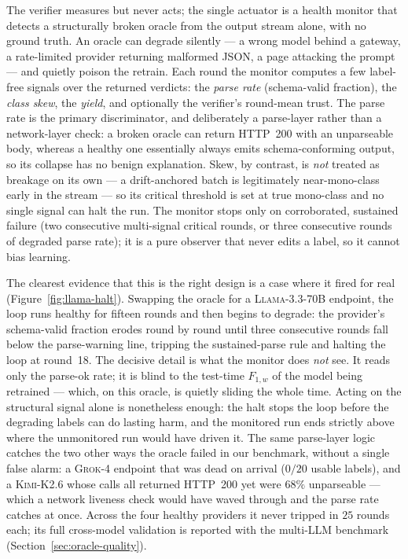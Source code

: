 The verifier measures but never acts; the single actuator is a health monitor
that detects a structurally broken oracle from the output stream alone, with no
ground truth. An oracle can degrade silently --- a wrong model behind a gateway, a
rate-limited provider returning malformed JSON, a page attacking the prompt ---
and quietly poison the retrain. Each round the monitor computes a few label-free
signals over the returned verdicts: the \emph{parse rate} (schema-valid
fraction), the \emph{class skew}, the \emph{yield}, and optionally the verifier's
round-mean trust. The parse rate is the primary discriminator, and deliberately a
parse-layer rather than a network-layer check: a broken oracle can return
HTTP~200 with an unparseable body, whereas a healthy one essentially always emits
schema-conforming output, so its collapse has no benign explanation. Skew, by
contrast, is \emph{not} treated as breakage on its own --- a drift-anchored batch
is legitimately near-mono-class early in the stream --- so its critical threshold
is set at true mono-class and no single signal can halt the run. The monitor
stops only on corroborated, sustained failure (two consecutive multi-signal
critical rounds, or three consecutive rounds of degraded parse rate); it is a
pure observer that never edits a label, so it cannot bias learning.

The clearest evidence that this is the right design is a case where it fired for
real (Figure~\ref{fig:llama-halt}). Swapping the oracle for a
\textsc{Llama-3.3-70B} endpoint, the loop runs healthy for fifteen rounds and
then begins to degrade: the provider's schema-valid fraction erodes round by
round until three consecutive rounds fall below the parse-warning line, tripping
the sustained-parse rule and halting the loop at round~18. The decisive detail is
what the monitor does \emph{not} see. It reads only the parse-ok rate; it is
blind to the test-time $F_{1,w}$ of the model being retrained --- which, on this
oracle, is quietly sliding the whole time. Acting on the structural signal alone
is nonetheless enough: the halt stops the loop before the degrading labels can do
lasting harm, and the monitored run ends strictly above where the unmonitored run
would have driven it. The same parse-layer logic catches the two other ways the
oracle failed in our benchmark, without a single false alarm: a \textsc{Grok-4}
endpoint that was dead on arrival ($0/20$ usable labels), and a \textsc{Kimi-K2.6}
whose calls all returned HTTP~200 yet were $68\%$ unparseable --- which a network
liveness check would have waved through and the parse rate catches at once. Across
the four healthy providers it never tripped in $25$ rounds each; its full
cross-model validation is reported with the multi-LLM benchmark
(Section~\ref{sec:oracle-quality}).

